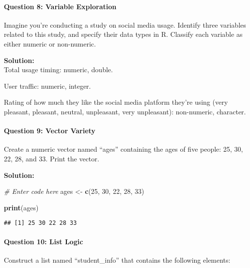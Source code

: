 \documentclass[
]{article}
\newenvironment{Shaded}{\begin{snugshade}}{\end{snugshade}}
\newcommand{\CommentTok}[1]{\textcolor[rgb]{0.56,0.35,0.01}{\textit{#1}}}
\newcommand{\DecValTok}[1]{\textcolor[rgb]{0.00,0.00,0.81}{#1}}
\newcommand{\FunctionTok}[1]{\textcolor[rgb]{0.13,0.29,0.53}{\textbf{#1}}}
\newcommand{\NormalTok}[1]{#1}
\newcommand{\OtherTok}[1]{\textcolor[rgb]{0.56,0.35,0.01}{#1}}
\begin{document}
\hypertarget{question-8-variable-exploration}{%
\paragraph{Question 8: Variable
Exploration}\label{question-8-variable-exploration}}

Imagine you're conducting a study on social media usage. Identify three
variables related to this study, and specify their data types in R.
Classify each variable as either numeric or non-numeric.

\textbf{Solution:}\\
Total usage timing: numeric, double.

User traffic: numeric, integer.

Rating of how much they like the social media platform they're using
(very pleasant, pleasant, neutral, unpleasant, very unpleasant):
non-numeric, character.

\hypertarget{question-9-vector-variety}{%
\paragraph{Question 9: Vector Variety}\label{question-9-vector-variety}}

Create a numeric vector named ``ages'' containing the ages of five
people: 25, 30, 22, 28, and 33. Print the vector.

\textbf{Solution:}

\begin{Shaded}
\begin{Highlighting}[]
\CommentTok{\# Enter code here}
\NormalTok{ages }\OtherTok{\textless{}{-}} \FunctionTok{c}\NormalTok{(}\DecValTok{25}\NormalTok{, }\DecValTok{30}\NormalTok{, }\DecValTok{22}\NormalTok{, }\DecValTok{28}\NormalTok{, }\DecValTok{33}\NormalTok{)}

\FunctionTok{print}\NormalTok{(ages)}
\end{Highlighting}
\end{Shaded}

\begin{verbatim}
## [1] 25 30 22 28 33
\end{verbatim}

\hypertarget{question-10-list-logic}{%
\paragraph{Question 10: List Logic}\label{question-10-list-logic}}

Construct a list named ``student\_info'' that contains the following
elements:
\end{document}

